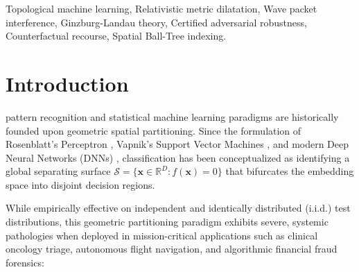 \documentclass[journal,twoside]{IEEEtran}
\theoremstyle{remark}
\begin{document}
\begin{IEEEkeywords}
Topological machine learning, Relativistic metric dilatation, Wave packet interference, Ginzburg-Landau theory, Certified adversarial robustness, Counterfactual recourse, Spatial Ball-Tree indexing.
\end{IEEEkeywords}

\IEEEpeerreviewmaketitle

\section{Introduction}

 pattern recognition and statistical machine learning paradigms are historically founded upon geometric spatial partitioning. Since the formulation of Rosenblatt's Perceptron \cite{rosenblatt1958perceptron}, Vapnik's Support Vector Machines \cite{vapnik1998statistical}, and modern Deep Neural Networks (DNNs) \cite{lecun2015deep}, classification has been conceptualized as identifying a global separating surface $\mathcal{S} = \{\mathbf{x} \in \mathbb{R}^D : f(\mathbf{x}) = 0\}$ that bifurcates the embedding space into disjoint decision regions. 

While empirically effective on independent and identically distributed (i.i.d.) test distributions, this geometric partitioning paradigm exhibits severe, systemic pathologies when deployed in mission-critical applications such as clinical oncology triage, autonomous flight navigation, and algorithmic financial fraud forensics:
\end{document}
